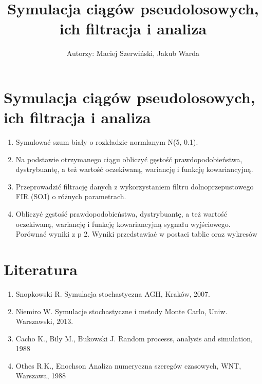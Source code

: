 \documentclass[11pt]{article}
\title{Symulacja ciągów pseudolosowych, ich filtracja i analiza}
\author{Autorzy: Maciej Szerwiński, Jakub Warda}
\providecommand{\tightlist}{%
      \setlength{\itemsep}{0pt}\setlength{\parskip}{0pt}}
\begin{document}
    
\begin{titlepage}
    \maketitle
    \begin{center}
    \end{center}
\end{titlepage}

    \hypertarget{symulacja-ciux105guxf3w-pseudolosowych-ich-filtracja-i-analiza}{%
\section{Symulacja ciągów pseudolosowych, ich filtracja i
analiza}\label{symulacja-ciux105guxf3w-pseudolosowych-ich-filtracja-i-analiza}}

\begin{enumerate}
\def\labelenumi{\arabic{enumi}.}
\tightlist
\item
  Symulować szum biały o rozkładzie normlanym N(5, 0.1).
\item
  Na podstawie otrzymanego ciągu obliczyć gęstość prawdopodobieństwa,
  dystrybuantę, a też wartość oczekiwaną, wariancję i funkcję
  kowariancyjną.
\item
  Przeprowadzić filtrację danych z wykorzystaniem filtru
  dolnoprzepustowego FIR (SOJ) o różnych parametrach.
\item
  Obliczyć gęstość prawdopodobieństwa, dystrybuantę, a też wartość
  oczekiwaną, wariancję i funkcję kowariancyjną sygnału wyjściowego.
  Porównać wyniki z p 2. Wyniki przedstawiać w postaci tablic oraz
  wykresów
\end{enumerate}

    \hypertarget{literatura}{%
\section{Literatura}\label{literatura}}

\begin{enumerate}
\def\labelenumi{\arabic{enumi}.}
\tightlist
\item
  Snopkowski R. Symulacja stochastyczna AGH, Kraków, 2007.
\item
  Niemiro W. Symulacje stochastyczne i metody Monte Carlo, Uniw.
  Warszawski, 2013.
\item
  Cacho K., Bily M., Bukowski J. Random processs, analysis and
  simulation, 1988
\item
  Othes R.K., Enochson Analiza numeryczna szeregów czasowych, WNT,
  Warszawa, 1988
\end{enumerate}
\end{document}
